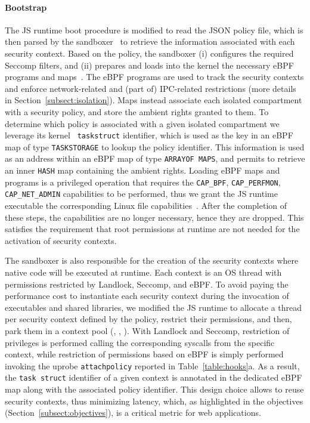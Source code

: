 \paragraph{Bootstrap}
The JS runtime boot procedure is modified to read the JSON policy
file, which is then parsed by the sandboxer~\blackcircle{$\alpha$} to
retrieve the information associated with each security context. Based
on the policy,
%
  the sandboxer (i) configures the required Seccomp filters, and (ii)
  prepares and loads into the kernel the necessary eBPF programs and
  maps~\blackcircle{$\beta$}. The eBPF programs are used to track the
  security contexts and enforce network-related and (part of)
  IPC-related restrictions (more details in
  Section~\ref{subsect:isolation}). Maps instead associate each
  isolated compartment with a security policy, and store the ambient
  rights granted to them. To determine which policy is associated with
  a given isolated compartment we leverage its kernel {\tt
    task\textunderscore struct} identifier, which is used as the key
  in an eBPF map of type {\tt TASK\textunderscore STORAGE} to lookup
  the policy identifier. This information is used as an address within
  an eBPF map of type {\tt ARRAY\textunderscore OF\textunderscore
    MAPS}, and permits to retrieve an inner {\tt HASH} map containing
  the ambient rights.
%
Loading eBPF maps and programs is a privileged operation
that requires the {\tt CAP\_BPF}, {\tt CAP\_PERFMON}, {\tt
  CAP\_NET\_ADMIN} capabilities to be performed, thus we grant the JS
runtime executable the corresponding Linux file
capabilities~\cite{file-based-capabilities}.  After the completion of
these steps, the capabilities are no longer necessary, hence they are
dropped. This satisfies the requirement that root permissions at
runtime are not needed for the activation of security contexts.

The sandboxer is also responsible for the creation of the security
contexts where native code will be executed at runtime. Each context
is an OS thread with permissions restricted by Landlock, Seccomp, and
eBPF. To avoid paying the performance cost to instantiate
each security context during the invocation of executables
and shared libraries, we modified the JS runtime to allocate
a thread per security context defined by the policy, restrict their
permissions, and then, park them in a context pool (,
, ).
%
  With Landlock and Seccomp, restriction of privileges is performed
  calling the corresponding syscalls from the specific context, while
  restriction of permissions based on eBPF is simply performed
  invoking the uprobe {\tt attach\textunderscore policy} reported in
  Table~\ref{table:hooks}a. As a result, the {\tt task\textunderscore
    struct} identifier of a given context is annotated in the
  dedicated eBPF map along with the associated policy identifier.  
%
This design choice allows to reuse security contexts, thus
  minimizing latency, which, as highlighted in the objectives
(Section~\ref{subsect:objectives}), is a critical metric for web
applications.

